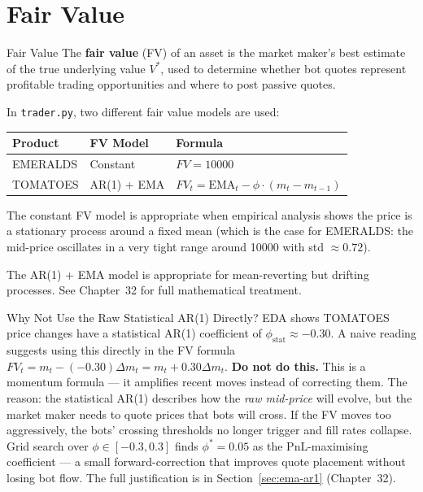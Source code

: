 \documentclass[12pt,a4paper,openany]{report}
\theoremstyle{definition}
\begin{document}
\section{Fair Value}

\begin{definitionbox}{Fair Value}
The \textbf{fair value} (FV) of an asset is the market maker's best estimate of the true underlying value $V^*$, used to determine whether bot quotes represent profitable trading opportunities and where to post passive quotes.
\end{definitionbox}

In \texttt{trader.py}, two different fair value models are used:

\begin{center}
\begin{tabular}{lll}
\toprule
\textbf{Product} & \textbf{FV Model} & \textbf{Formula} \\
\midrule
EMERALDS & Constant & $FV = 10000$ \\
TOMATOES & AR(1) + EMA & $FV_t = \text{EMA}_t - \phi \cdot (m_t - m_{t-1})$ \\
\bottomrule
\end{tabular}
\end{center}

The constant FV model is appropriate when empirical analysis shows the price is a stationary process around a fixed mean (which is the case for EMERALDS: the mid-price oscillates in a very tight range around 10000 with std $\approx 0.72$).

The AR(1) + EMA model is appropriate for mean-reverting but drifting processes. See Chapter~32 for full mathematical treatment.

\begin{warningbox}{Why Not Use the Raw Statistical AR(1) Directly?}
EDA shows TOMATOES price changes have a statistical AR(1) coefficient of $\phi_{\text{stat}} \approx -0.30$. A naive reading suggests using this directly in the FV formula $FV_t = m_t - (-0.30)\Delta m_t = m_t + 0.30\Delta m_t$. \textbf{Do not do this.} This is a momentum formula — it amplifies recent moves instead of correcting them. The reason: the statistical AR(1) describes how the \emph{raw mid-price} will evolve, but the market maker needs to quote prices that bots will cross. If the FV moves too aggressively, the bots' crossing thresholds no longer trigger and fill rates collapse. Grid search over $\phi \in [-0.3, 0.3]$ finds $\phi^* = 0.05$ as the PnL-maximising coefficient — a small forward-correction that improves quote placement without losing bot flow. The full justification is in Section~\ref{sec:ema-ar1} (Chapter~32).
\end{warningbox}
\end{document}
